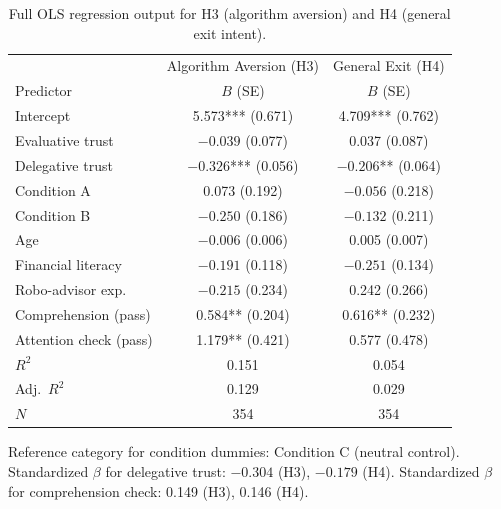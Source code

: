 \begin{table}[H]
\centering
\begin{threeparttable}
\caption{Full OLS regression output for H3 (algorithm aversion) and H4 (general exit intent).}
\label{tab:supp_reg_h3h4}
\begin{small}
\begin{tabular}{lcc}
\toprule
 & Algorithm Aversion (H3) & General Exit (H4) \\
Predictor & $B$ (SE) & $B$ (SE) \\
\midrule
Intercept              & 5.573*** (0.671)  & 4.709*** (0.762) \\
Evaluative trust       & $-0.039$ (0.077)  & 0.037 (0.087) \\
Delegative trust       & $-0.326$*** (0.056)  & $-0.206$** (0.064) \\
Condition A            & 0.073 (0.192)     & $-0.056$ (0.218) \\
Condition B            & $-0.250$ (0.186)  & $-0.132$ (0.211) \\
Age                    & $-0.006$ (0.006)  & 0.005 (0.007) \\
Financial literacy     & $-0.191$ (0.118)  & $-0.251$ (0.134) \\
Robo-advisor exp.      & $-0.215$ (0.234)  & 0.242 (0.266) \\
Comprehension (pass)   & 0.584** (0.204)   & 0.616** (0.232) \\
Attention check (pass) & 1.179** (0.421)   & 0.577 (0.478) \\
\midrule
$R^2$                  & 0.151             & 0.054 \\
Adj.\ $R^2$           & 0.129             & 0.029 \\
$N$                    & 354               & 354 \\
\bottomrule
\end{tabular}
\end{small}
\begin{tablenotes}
\small
\item Reference category for condition dummies: Condition C (neutral control). Standardized $\beta$ for delegative trust: $-0.304$ (H3), $-0.179$ (H4). Standardized $\beta$ for comprehension check: 0.149 (H3), 0.146 (H4).
\end{tablenotes}
\end{threeparttable}
\end{table}


